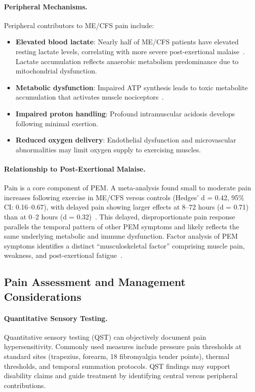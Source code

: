 \paragraph{Peripheral Mechanisms.}
Peripheral contributors to ME/CFS pain include:
\begin{itemize}
    \item \textbf{Elevated blood lactate}: Nearly half of ME/CFS patients have elevated resting lactate levels, correlating with more severe post-exertional malaise~\cite{Lien2019lactate}. Lactate accumulation reflects anaerobic metabolism predominance due to mitochondrial dysfunction.
    \item \textbf{Metabolic dysfunction}: Impaired ATP synthesis leads to toxic metabolite accumulation that activates muscle nociceptors~\cite{Jammes2021muscle}.
    \item \textbf{Impaired proton handling}: Profound intramuscular acidosis develops following minimal exertion.
    \item \textbf{Reduced oxygen delivery}: Endothelial dysfunction and microvascular abnormalities may limit oxygen supply to exercising muscles.
\end{itemize}

\paragraph{Relationship to Post-Exertional Malaise.}
Pain is a core component of PEM. A meta-analysis found small to moderate pain increases following exercise in ME/CFS versus controls (Hedges' d = 0.42, 95\% CI: 0.16--0.67), with delayed pain showing larger effects at 8--72 hours (d = 0.71) than at 0--2 hours (d = 0.32)~\cite{Barhorst2022painPEM}. This delayed, disproportionate pain response parallels the temporal pattern of other PEM symptoms and likely reflects the same underlying metabolic and immune dysfunction. Factor analysis of PEM symptoms identifies a distinct ``musculoskeletal factor'' comprising muscle pain, weakness, and post-exertional fatigue~\cite{Barhorst2022painPEM}.

\subsection{Pain Assessment and Management Considerations}
\label{subsec:pain-management}

\paragraph{Quantitative Sensory Testing.}
Quantitative sensory testing (QST) can objectively document pain hypersensitivity. Commonly used measures include pressure pain thresholds at standard sites (trapezius, forearm, 18 fibromyalgia tender points), thermal thresholds, and temporal summation protocols. QST findings may support disability claims and guide treatment by identifying central versus peripheral contributions.

